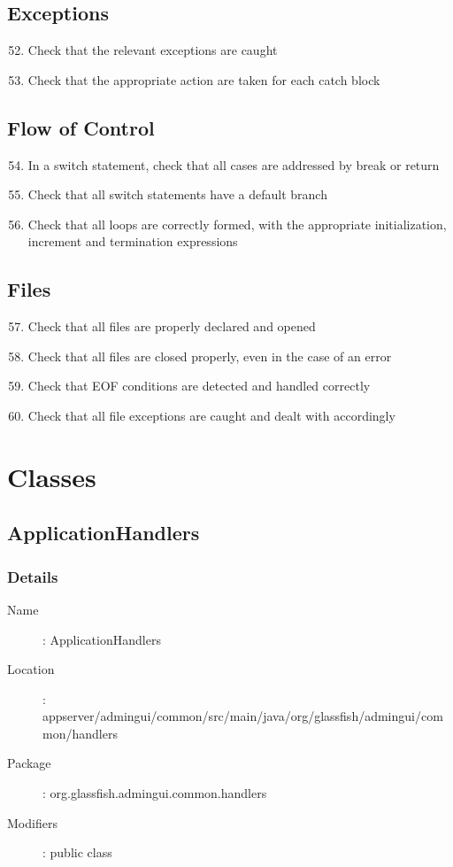 	\subsection{Exceptions}
	\begin{enumerate}
		\setcounter{enumi}{51}
		\item Check that the relevant exceptions are caught
		\item Check that the appropriate action are taken for each catch block
	\end{enumerate}
	\subsection{Flow of Control}
	\begin{enumerate}
		\setcounter{enumi}{53}
		\item In a switch statement, check that all cases are addressed by break or return
		\item Check that all switch statements have a default branch
		\item Check that all loops are correctly formed, with the appropriate initialization, increment and termination expressions
	\end{enumerate}
	\subsection{Files}
	\begin{enumerate}
		\setcounter{enumi}{56}
		\item Check that all files are properly declared and opened
		\item Check that all files are closed properly, even in the case of an error
		\item Check that EOF conditions are detected and handled correctly
		\item Check that all file exceptions are caught and dealt with accordingly
	\end{enumerate}
\newpage
\section{Classes}
	\subsection{ApplicationHandlers}
		\subsubsection{Details}
		\begin{description}
			\item[Name]: ApplicationHandlers
			\item[Location]: appserver/admingui/common/src/main/java/org/glassfish/admingui/common/handlers
			\item[Package]: org.glassfish.admingui.common.handlers
			\item[Modifiers]: public class
		\end{description}

